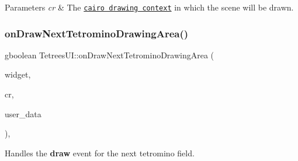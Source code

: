 \begin{DoxyParams}{Parameters}
{\em cr} & The \href{https://www.cairographics.org/manual/cairo-cairo-t.html}{\tt cairo drawing context} in which the scene will be drawn. \\
\hline
\end{DoxyParams}
\mbox{\label{classTetreesUI_aa775d6f3e3ca5c11ec3bb73e8dd7f62d}} 
\subsubsection{\texorpdfstring{on\+Draw\+Next\+Tetromino\+Drawing\+Area()}{onDrawNextTetrominoDrawingArea()}}
{\footnotesize\ttfamily gboolean Tetrees\+U\+I\+::on\+Draw\+Next\+Tetromino\+Drawing\+Area (\begin{DoxyParamCaption}\item[{Gtk\+Widget $\ast$}]{widget,  }\item[{cairo\+\_\+t $\ast$}]{cr,  }\item[{gpointer}]{user\+\_\+data }\end{DoxyParamCaption})\hspace{0.3cm}{\ttfamily [static]}, {\ttfamily [private]}}



Handles the {\bfseries draw} event for the next tetromino field. 

